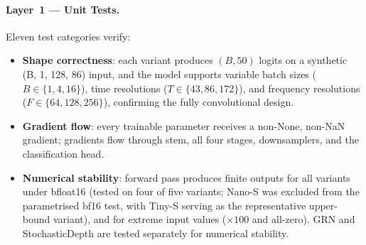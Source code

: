 \documentclass{article}
\begin{document}
\paragraph{Layer~1 --- Unit Tests.}
Eleven test categories verify:
\begin{itemize}
  \item \textbf{Shape correctness}: each variant produces $(B, 50)$ logits on a
  synthetic (B, 1, 128, 86) input, and the model supports variable batch sizes
  ($B \in \{1, 4, 16\}$), time resolutions ($T \in \{43, 86, 172\}$), and
  frequency resolutions ($F \in \{64, 128, 256\}$), confirming the fully
  convolutional design.
  \item \textbf{Gradient flow}: every trainable parameter receives a non-None,
  non-NaN gradient; gradients flow through stem, all four stages, downsamplers,
  and the classification head.
  \item \textbf{Numerical stability}: forward pass produces finite outputs for
  all variants under bfloat16 (tested on four of five variants; Nano-S was
  excluded from the parametrised bf16 test, with Tiny-S serving as the
  representative upper-bound variant), and for extreme input values ($\times 100$
  and all-zero). GRN and StochasticDepth are tested separately for numerical
  stability.
\end{itemize}
\end{document}
